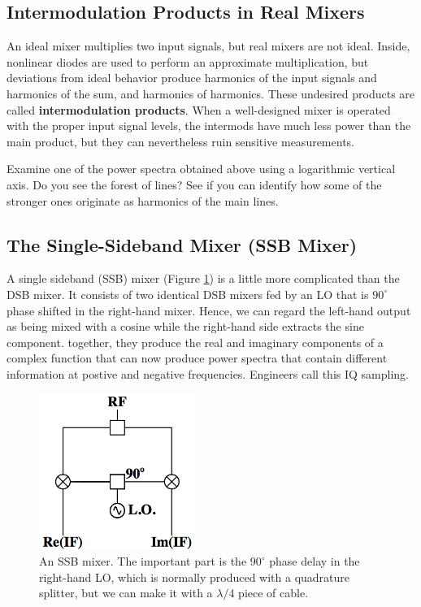 \documentclass[11pt,preprint]{aastex}
\begin{document}
\subsection{Intermodulation Products in Real Mixers}

\noindent
An ideal mixer multiplies two input
signals, but real mixers are not ideal. Inside,
nonlinear diodes are used to perform an approximate multiplication, but
deviations from ideal behavior 
produce harmonics of the input signals and harmonics of the sum, and harmonics
of harmonics.
These undesired products are called
{\bf intermodulation products}.
When a well-designed
mixer is operated with the proper input signal levels, the intermods
have much less power than the main product, but they can nevertheless
ruin sensitive measurements.

Examine one of the power spectra obtained above using a logarithmic vertical
axis.
Do you see the forest of lines?
See if you can identify how some of the
stronger ones originate as harmonics of the main lines.

\subsection{ The Single-Sideband Mixer (SSB Mixer)}
\label{sectssb}

\noindent
A single sideband (SSB) mixer (Figure \ref{ssb}) is a
little more complicated than the DSB mixer. It consists of two identical
DSB mixers fed by an LO that is $90^\circ$ phase shifted in the right-hand mixer.
Hence, we can regard the left-hand output as being mixed with a cosine while
the right-hand side extracts the sine component.
together, they produce the real and imaginary components of a complex function
that can now produce power spectra that contain different information
at postive and negative frequencies.
Engineers call this IQ sampling.

\begin{figure}[h!]
\begin{center}
  \includegraphics[height=2in]{ssbmixer.png}
\end{center}
\caption{\footnotesize An SSB mixer. The important part is the
  $90^\circ$ phase delay in the right-hand LO, which is normally
  produced with a quadrature splitter, but we can make it
  with a $\lambda/4$ piece of cable. \label{ssb}}
\end{figure}
\end{document}
